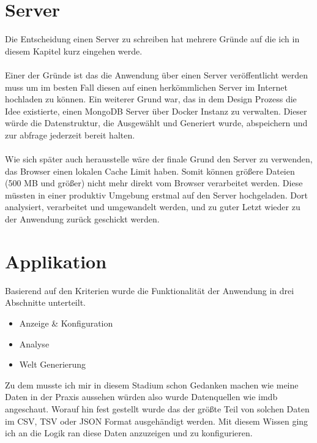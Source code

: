 \section{Server}
Die Entscheidung einen Server zu schreiben hat mehrere Gründe auf die ich in diesem Kapitel kurz eingehen werde. \\ \\
Einer der Gründe ist das die Anwendung über einen Server veröffentlicht werden muss um im besten Fall diesen auf einen herkömmlichen Server im
Internet hochladen zu können. Ein weiterer Grund war, das in dem Design Prozess die Idee existierte, einen MongoDB Server über Docker Instanz
zu verwalten. Dieser würde die Datenstruktur, die Ausgewählt und Generiert wurde, abspeichern und zur abfrage jederzeit bereit halten. \\ \\
Wie sich später auch herausstelle wäre der finale Grund den Server zu verwenden, das Browser einen lokalen Cache Limit haben. Somit können
größere Dateien (500 MB und größer) nicht mehr direkt vom Browser verarbeitet werden. Diese müssten in einer produktiv Umgebung erstmal auf
den Server hochgeladen. Dort analysiert, verarbeitet und umgewandelt werden, und zu guter Letzt wieder zu der Anwendung zurück geschickt
werden.
\newpage

\section{Applikation}
Basierend auf den Kriterien wurde die Funktionalität der Anwendung in drei Abschnitte unterteilt.
\begin{itemize}
    \item Anzeige \& Konfiguration
    \item Analyse
    \item Welt Generierung
\end{itemize}
Zu dem musste ich mir in diesem Stadium schon Gedanken machen wie meine Daten in der Praxis aussehen würden also wurde Datenquellen wie
imdb angeschaut. Worauf hin fest gestellt wurde das der größte Teil von solchen Daten im CSV, TSV oder JSON Format ausgehändigt werden. Mit
diesem Wissen ging ich an die Logik ran diese Daten anzuzeigen und zu konfigurieren.

